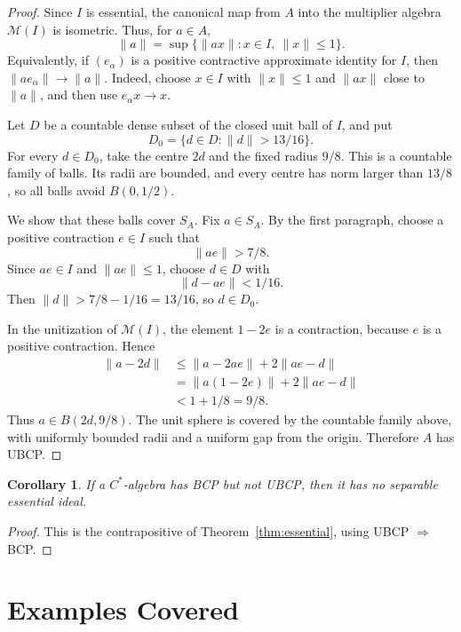 \documentclass[11pt]{article}
\newtheorem{corollary}{Corollary}
\newcommand{\Mcal}{\mathcal M}
\begin{document}
\begin{proof}
Since \(I\) is essential, the canonical map from \(A\) into the multiplier
algebra \(\Mcal(I)\) is isometric.  Thus, for \(a\in A\),
\[
        \|a\|
        =
        \sup\{\|ax\|:x\in I,\ \|x\|\le1\}.
\]
Equivalently, if \((e_\alpha)\) is a positive contractive approximate
identity for \(I\), then \(\|ae_\alpha\|\to\|a\|\).  Indeed, choose
\(x\in I\) with \(\|x\|\le1\) and \(\|ax\|\) close to \(\|a\|\), and then use
\(e_\alpha x\to x\).

Let \(D\) be a countable dense subset of the closed unit ball of \(I\), and
put
\[
        D_0=\{d\in D:\|d\|>13/16\}.
\]
For every \(d\in D_0\), take the centre \(2d\) and the fixed radius \(9/8\).
This is a countable family of balls.  Its radii are bounded, and every centre
has norm larger than \(13/8\), so all balls avoid \(B(0,1/2)\).

We show that these balls cover \(S_A\).  Fix \(a\in S_A\).  By the first
paragraph, choose a positive contraction \(e\in I\) such that
\[
        \|ae\|>7/8.
\]
Since \(ae\in I\) and \(\|ae\|\le1\), choose \(d\in D\) with
\[
        \|d-ae\|<1/16.
\]
Then \(\|d\|>7/8-1/16=13/16\), so \(d\in D_0\).

In the unitization of \(\Mcal(I)\), the element \(1-2e\) is a contraction,
because \(e\) is a positive contraction.  Hence
\[
\begin{aligned}
        \|a-2d\|
        &\le \|a-2ae\|+2\|ae-d\|\\
        &=   \|a(1-2e)\|+2\|ae-d\|\\
        &<  1+1/8
        =   9/8.
\end{aligned}
\]
Thus \(a\in B(2d,9/8)\).  The unit sphere is covered by the countable family
above, with uniformly bounded radii and a uniform gap from the origin.
Therefore \(A\) has UBCP.
\end{proof}

\begin{corollary}
\label{cor:no-essential}
If a \(C^*\)-algebra has BCP but not UBCP, then it has no separable essential
ideal.
\end{corollary}

\begin{proof}
This is the contrapositive of Theorem~\ref{thm:essential}, using
UBCP \(\Rightarrow\) BCP.
\end{proof}

\section*{Examples Covered}
\end{document}
